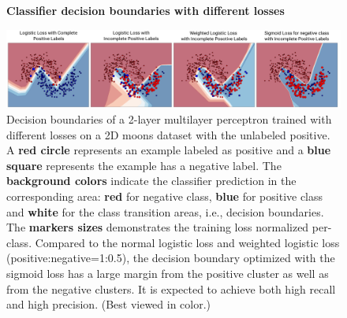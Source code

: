 \begin{figure}
\begin{center}
\textbf{Classifier decision boundaries with different losses}\par\medskip
   \includegraphics[width=0.95\linewidth]{img/moons.pdf}
\end{center}
   \caption{
   Decision boundaries of a 2-layer multilayer perceptron trained with different losses on a 2D moons dataset with the unlabeled positive.
   A \textbf{red circle} represents an example labeled as positive and a \textbf{blue square} represents the example has a negative label.
   The \textbf{background colors} indicate the classifier prediction in the corresponding area: \textbf{red} for negative class, \textbf{blue} for positive class and \textbf{white} for the class transition areas, i.e., decision boundaries.
   The \textbf{markers sizes} demonstrates the training loss normalized per-class.
   Compared to the normal logistic loss and weighted logistic loss (positive:negative=1:0.5), the decision boundary optimized with the sigmoid loss has a large margin from the positive cluster as well as from the negative clusters.
   It is expected to achieve both high recall and high precision.
   (Best viewed in color.)
   }
\label{fig:moons}
\end{figure}


